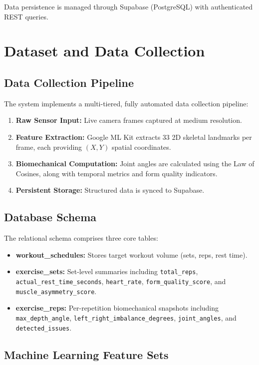 \documentclass[conference]{IEEEtran}
\begin{document}
Data persistence is managed through Supabase (PostgreSQL) with authenticated REST queries.

\section{Dataset and Data Collection}

\subsection{Data Collection Pipeline}

The system implements a multi-tiered, fully automated data collection pipeline:

\begin{enumerate}
\item \textbf{Raw Sensor Input:} Live camera frames captured at medium resolution.
\item \textbf{Feature Extraction:} Google ML Kit extracts 33 2D skeletal landmarks per frame, each providing $(X, Y)$ spatial coordinates.
\item \textbf{Biomechanical Computation:} Joint angles are calculated using the Law of Cosines, along with temporal metrics and form quality indicators.
\item \textbf{Persistent Storage:} Structured data is synced to Supabase.
\end{enumerate}

\subsection{Database Schema}

The relational schema comprises three core tables:

\begin{itemize}
\item \textbf{workout\_schedules:} Stores target workout volume (sets, reps, rest time).
\item \textbf{exercise\_sets:} Set-level summaries including \texttt{total\_reps}, \texttt{actual\_rest\_time\_seconds}, \texttt{heart\_rate}, \texttt{form\_quality\_score}, and \texttt{muscle\_asymmetry\_score}.
\item \textbf{exercise\_reps:} Per-repetition biomechanical snapshots including \texttt{max\_depth\_angle}, \texttt{left\_right\_imbalance\_degrees}, \texttt{joint\_angles}, and \texttt{detected\_issues}.
\end{itemize}

\subsection{Machine Learning Feature Sets}
\end{document}
